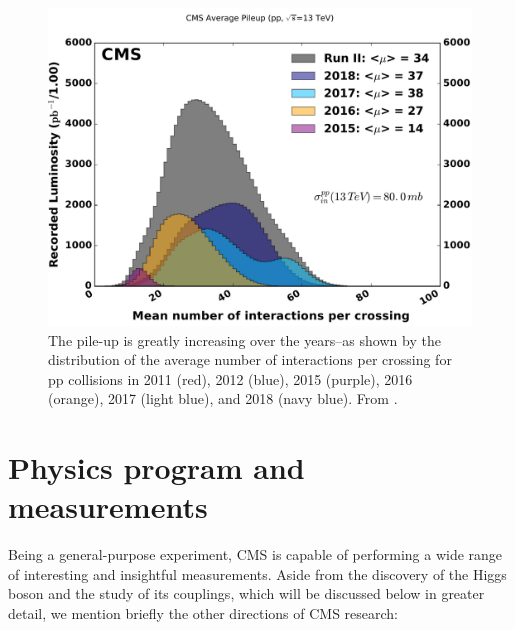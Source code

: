 \begin{figure}
    \centering
     \includegraphics[width=\columnwidth]{gfx/ch1/pileup_allYears_run2.pdf}
    \caption[Pile-up]{The pile-up is greatly increasing over the years--as shown by the distribution of the average number of interactions per crossing for pp collisions in 2011 (red), 2012 (blue), 2015 (purple), 2016 (orange), 2017 (light blue), and 2018 (navy blue). From \cite{cmspubliclumi}.}
    \label{fig:pileup}
\end{figure}

\section{Physics program and measurements}

Being a general-purpose experiment, CMS is capable of performing a wide range of interesting and insightful measurements. Aside from the discovery of the Higgs boson and the study of its couplings, which will be discussed below in greater detail, we mention briefly the other directions of CMS research:

